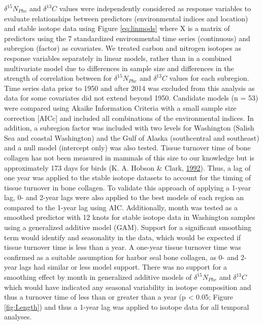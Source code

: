 \documentclass [11pt, proquest] {uwthesis}[2015/03/03]
\begin{document}
\(\delta^{15}N_{Phe}\) and \(\delta^{13}C\) values were independently
considered as response variables to evaluate relationships between
predictors (environmental indices and location) and stable isotope data
using Figure \eqref{eq:linmods} where X is a matrix of predictors using
the 7 standardized environmental time series (continuous) and subregion
(factor) as covariates. We treated carbon and nitrogen isotopes as
response variables separately in linear models, rather than in a
combined multivariate model due to differences in sample size and
differences in the strength of correlation between for
\(\delta^{15}N_{Phe}\) and \(\delta^{13}C\) values for each subregion.
Time series data prior to 1950 and after 2014 was excluded from this
analysis as data for some covariates did not extend beyond 1950.
Candidate models (n = 53) were compared using Akaike Information
Criteria with a small sample size correction {[}AICc{]} and included all
combinations of the environmental indices. In addition, a subregion
factor was included with two levels for Washington (Salish Sea and
coastal Washington) and the Gulf of Alaska (southcentral and southeast)
and a null model (intercept only) was also tested. Tissue turnover time
of bone collagen has not been measured in mammals of this size to our
knowledge but is approximately 173 days for birds (K. A. Hobson \&
Clark, \protect\hyperlink{ref-Hobson1992}{1992}). Thus, a lag of one
year was applied to the stable isotope datasets to account for the
timing of tissue turnover in bone collagen. To validate this approach of
applying a 1-year lag, 0- and 2-year lags were also applied to the best
models of each region an compared to the 1-year lag using AIC.
Additionally, month was tested as a smoothed predictor with 12 knots for
stable isotope data in Washington samples using a generalized additive
model (GAM). Support for a significant smoothing term would identify and
seasonality in the data, which would be expected if tissue turnover time
is less than a year. A one-year tissue turnover time was confirmed as a
suitable assumption for harbor seal bone collagen, as 0- and 2- year
lags had similar or less model support. There was no support for a
smoothing effect by month in generalized additive models of
\(\delta^{15}N_{Phe}\) and \(\delta^{13}C\) which would have indicated
any seasonal variability in isotope composition and thus a turnover time
of less than or greater than a year (p \textless{} 0.05; Figure
\ref{fig:Length}) and thus a 1-year lag was applied to isotope data for
all temporal analyses.
\end{document}

